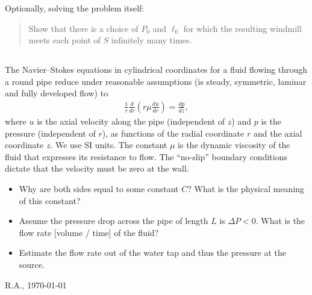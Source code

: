 \documentclass[12pt,a4paper]{article}
\begin{document}
    Optionally, solving the problem itself:
    \begin{quote}
        Show that there is a choice of $P_0$ and $\ell_0$
        for which
        the resulting windmill 
        meets each point of $S$ infinitely many times.
    \end{quote}
    
    
    
    \subsection{}
    
    The Navier--Stokes equations 
    in cylindrical coordinates
    for a fluid flowing
    through a round pipe
    reduce 
    under reasonable assumptions 
    (is steady, symmetric, laminar and fully developed flow)
    to 
    \begin{align}
        \frac{1}{r}
        \frac{d}{dr} \left( r \mu \frac{d u}{dr} \right)
        =
        \frac{d p}{d z}
        ,
    \end{align}
    where $u$ is the axial velocity along the pipe
    (independent of $z$)
    and $p$ is the pressure
    (independent of $r$),
    as functions of the radial coordinate $r$ and the axial coordinate $z$.
    We use SI units.
    The constant $\mu$ is the dynamic viscosity of the fluid
    that expresses its resistance to flow.
    The ``no-slip'' boundary conditions 
    dictate that 
    the velocity must be zero at the wall.
    
    \begin{itemize}
    \item  
        Why are both sides equal to some constant $C$?
        What is the physical meaning of this constant?
    \item
        Assume the pressure drop across the pipe 
        of length $L$ is $\Delta P < 0$.
        What is the flow rate [volume / time]
        of the fluid?
    \item
        Estimate the flow rate out of the water tap
        and 
        thus the pressure at the source.
    \end{itemize}


    
    
    
    


    \vfill\hfill R.A., \today
\end{document}
